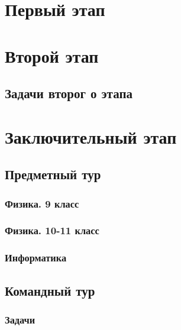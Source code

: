 \documentclass[a4paper,12pt,oneside]{book}
\begin{document}

\setcounter{tocdepth}{1}

\tableofcontents

\part{Первый этап}

\clearpage




\part{Второй этап}

\clearpage
\chapter{Задачи второг
о этапа}



\part{Заключительный этап} 

\clearpage 
\chapter{Предметный тур}

\section{Физика. 9 класс}


\section{Физика. 10-11 класс}


\section{Информатика}



\chapter{Командный тур}

\section{Задачи}




\end{document}
